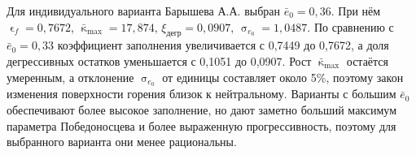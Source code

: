 \documentclass[a4paper,12pt]{article}
\renewcommand{\varepsilon}{\upvarepsilon}
\renewcommand{\sigma}{\upsigma}
\renewcommand{\kappa}{\upkappa}
\newcommand{\heading}[1]{%
          \par\noindent{\centering\fontsize{16pt}{24pt}\selectfont\bfseries #1\par}%
        }
\begin{document}
        \clearpage
        \heading{6. Заключение}
        Для индивидуального варианта Барышева А.А. выбран $\bar e_0=0,36$. При нём $\varepsilon_f=0,7672$, $\bar\kappa_{\max}=17,874$, $\xi_{\mathrm{дегр}}=0,0907$, $\sigma_{e_0}=1,0487$. По сравнению с $\bar e_0=0,33$ коэффициент заполнения увеличивается с 0,7449 до 0,7672, а доля дегрессивных остатков уменьшается с 0,1051 до 0,0907. Рост $\bar\kappa_{\max}$ остаётся умеренным, а отклонение $\sigma_{e_0}$ от единицы составляет около 5\%, поэтому закон изменения поверхности горения близок к нейтральному. Варианты с большим $\bar e_0$ обеспечивают более высокое заполнение, но дают заметно больший максимум параметра Победоносцева и более выраженную прогрессивность, поэтому для выбранного варианта они менее рациональны.

        
\end{document}
